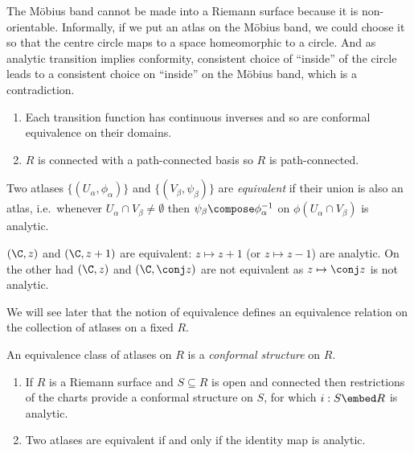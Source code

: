 \documentclass[a4paper]{article}
\begin{document}
\begin{eg}
  The Möbius band cannot be made into a Riemann surface because it is non-orientable. Informally, if we put an atlas on the Möbius band, we could choose it so that the centre circle maps to a space homeomorphic to a circle. And as analytic transition implies conformity, consistent choice of ``inside'' of the circle leads to a consistent choice on ``inside'' on the Möbius band, which is a contradiction.
\end{eg}

\begin{remark}\leavevmode
  \begin{enumerate}
  \item Each transition function has continuous inverses and so are conformal equivalence on their domains.
  \item \(R\) is connected with a path-connected basis so \(R\) is path-connected.
  \end{enumerate}
\end{remark}

\begin{definition}
  Two atlases \(\{(U_\alpha, \phi_\alpha)\}\) and \(\{(V_\beta, \psi_\beta)\}\) are \emph{equivalent} if their union is also an atlas, i.e.\ whenever \(U_\alpha \cap V_\beta \neq \emptyset\) then \(\psi_\beta \compose \phi_\alpha^{-1}\) on \(\phi(U_\alpha \cap V_\beta)\) is analytic.
\end{definition}

\begin{eg}
  \((\C, z)\) and \((\C, z + 1)\) are equivalent: \(z \mapsto z + 1\) (or \(z \mapsto z - 1\)) are analytic. On the other had \((\C, z)\) and \((\C, \conj z)\) are not equivalent as \(z \mapsto \conj z\) is not analytic.
\end{eg}

We will see later that the notion of equivalence defines an equivalence relation on the collection of atlases on a fixed \(R\).

\begin{definition}
  An equivalence class of atlases on \(R\) is a \emph{conformal structure} on \(R\).
\end{definition}

\begin{remark}\leavevmode
  \begin{enumerate}
  \item If \(R\) is a Riemann surface and \(S \subseteq R\) is open and connected then restrictions of the charts provide a conformal structure on \(S\), for which \(i: S \embed R\) is analytic.
  \item Two atlases are equivalent if and only if the identity map is analytic.
  \end{enumerate}
\end{remark}
\end{document}
